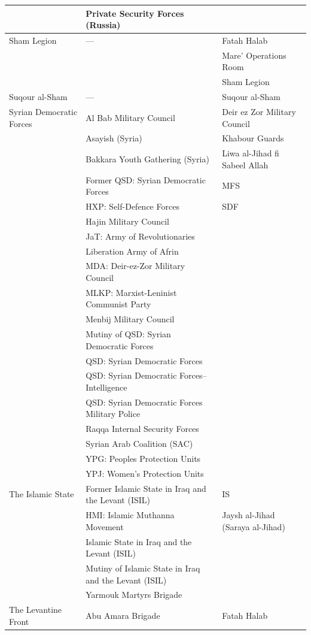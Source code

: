 \begin{longtable}{@{}>{\raggedright\arraybackslash}p{3.15cm} >{\raggedright\arraybackslash}p{6.15cm} >{\raggedright\arraybackslash}p{6.15cm}@{}}
 & Private Security Forces (Russia) &  \\
\hline
Sham Legion & --- & Fatah Halab \\
 &  & Mare' Operations Room \\
 &  & Sham Legion \\
\hline
Suqour al-Sham & --- & Suqour al-Sham \\
\hline
Syrian Democratic Forces & Al Bab Military Council & Deir ez Zor Military Council \\
 & Asayish (Syria) & Khabour Guards \\
 & Bakkara Youth Gathering (Syria) & Liwa al-Jihad fi Sabeel Allah \\
 & Former QSD: Syrian Democratic Forces & MFS \\
 & HXP: Self-Defence Forces & SDF \\
 & Hajin Military Council &  \\
 & JaT: Army of Revolutionaries &  \\
 & Liberation Army of Afrin &  \\
 & MDA: Deir-ez-Zor Military Council &  \\
 & MLKP: Marxist-Leninist Communist Party &  \\
 & Menbij Military Council &  \\
 & Mutiny of QSD: Syrian Democratic Forces &  \\
 & QSD: Syrian Democratic Forces &  \\
 & QSD: Syrian Democratic Forces--Intelligence &  \\
 & QSD: Syrian Democratic Forces Military Police &  \\
 & Raqqa Internal Security Forces &  \\
 & Syrian Arab Coalition (SAC) &  \\
 & YPG: Peoples Protection Units &  \\
 & YPJ: Women's Protection Units &  \\
\hline
The Islamic State & Former Islamic State in Iraq and the Levant (ISIL) & IS \\
 & HMI: Islamic Muthanna Movement & Jaysh al-Jihad (Saraya al-Jihad) \\
 & Islamic State in Iraq and the Levant (ISIL) &  \\
 & Mutiny of Islamic State in Iraq and the Levant (ISIL) &  \\
 & Yarmouk Martyrs Brigade &  \\
\hline
The Levantine Front & Abu Amara Brigade & Fatah Halab \\

\end{longtable}
